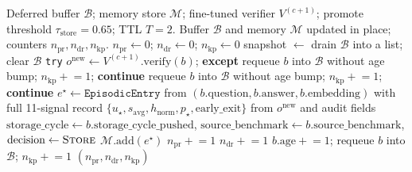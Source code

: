 \begin{algorithm}
\caption{Stage~8b deferred-entry reconsideration (runs once per cycle boundary, after retroverify, on non-aborted cycles).}
\label{alg:deferred-reconsider}
\begin{algorithmic}[1]
\Require Deferred buffer $\mathcal{B}$; memory store $\mathcal{M}$; fine-tuned verifier $V^{(c+1)}$; promote threshold $\tau_{\text{store}} = 0.65$; TTL $T = 2$.
\Ensure Buffer $\mathcal{B}$ and memory $\mathcal{M}$ updated in place; counters $n_{\text{pr}}, n_{\text{dr}}, n_{\text{kp}}$.
\State $n_{\text{pr}} \gets 0$; $n_{\text{dr}} \gets 0$; $n_{\text{kp}} \gets 0$
\State snapshot $\gets$ drain $\mathcal{B}$ into a list; clear $\mathcal{B}$ 
    \State \texttt{try} $o^{\text{new}} \gets V^{(c+1)}.\text{verify}(b)$; \textbf{except} requeue $b$ into $\mathcal{B}$ without age bump; $n_{\text{kp}} \mathrel{+}= 1$; \textbf{continue}
        \State requeue $b$ into $\mathcal{B}$ without age bump; $n_{\text{kp}} \mathrel{+}= 1$; \textbf{continue} 
    \EndIf
        \State $e^{\star} \gets \mathtt{EpisodicEntry}$ from $(b.\text{question}, b.\text{answer}, b.\text{embedding})$
        \State \hspace{1.2em} with full 11-signal record $\{u_\star, s_{\text{avg}}, h_{\text{norm}}, p_\star, \text{early\_exit}\}$ from $o^{\text{new}}$
        \State \hspace{1.2em} and audit fields $\text{storage\_cycle} \gets b.\text{storage\_cycle\_pushed}$, $\text{source\_benchmark} \gets b.\text{source\_benchmark}$, $\text{decision} \gets \textsc{Store}$
            \State $\mathcal{M}.\text{add}(e^{\star})$ 
        \EndIf
        \State $n_{\text{pr}} \mathrel{+}= 1$ 
        \State $n_{\text{dr}} \mathrel{+}= 1$ 
    \Else
        \State $b.\text{age} \mathrel{+}= 1$; requeue $b$ into $\mathcal{B}$; $n_{\text{kp}} \mathrel{+}= 1$
    \EndIf
\EndFor
\State \Return $(n_{\text{pr}}, n_{\text{dr}}, n_{\text{kp}})$
\end{algorithmic}
\end{algorithm}

